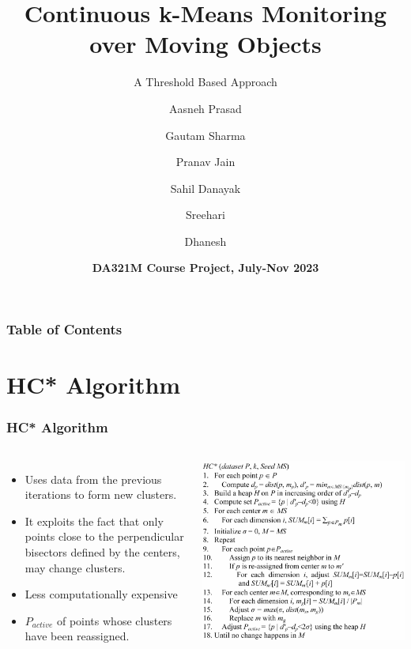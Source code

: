 \documentclass{beamer}
\title[Threshold Based \textit{K}-Means Monitoring] %
{Continuous k-Means Monitoring
over Moving Objects}
\subtitle{A Threshold Based Approach}
\author[Group 7] %
{Aasneh Prasad \and Gautam Sharma \and Pranav Jain \and Sahil Danayak \and Sreehari \and Dhanesh}
\date[16th November 2023] %
{\textbf{DA321M Course Project, July-Nov 2023}}
\begin{document}
\frame{\titlepage}


\begin{frame}
\frametitle{Table of Contents}
\tableofcontents
\end{frame}


\section{HC* Algorithm}
\begin{frame}
\frametitle{HC* Algorithm}

\begin{columns}

\begin{itemize}
\item Uses data from the previous iterations to form new clusters.
\item  It exploits the fact that only points close to the perpendicular bisectors defined by the centers, may change clusters.
\item Less computationally expensive
\item $P_{active}$ of points whose clusters have been reassigned.

\end{itemize}

\includegraphics[width=1\textwidth]{Pic1.png}

\end{columns}
\end{frame}
\end{document}
